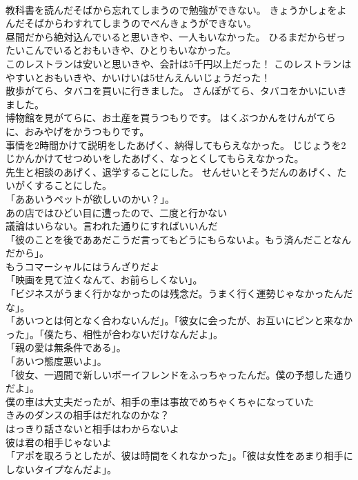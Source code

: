 \documentclass[8pt]{extreport}
\begin{document}
\begin{CJK}{UTF8}{min}
\\	教科書を読んだそばから忘れてしまうので勉強ができない。	きょうかしょをよんだそばからわすれてしまうのでべんきょうができない。 
\\	昼間だから絶対込んでいると思いきや、一人もいなかった。	ひるまだからぜったいこんでいるとおもいきや、ひとりもいなかった。 
\\	このレストランは安いと思いきや、会計は5千円以上だった！	このレストランはやすいとおもいきや、かいけいは5せんえんいじょうだった！ 
\\	散歩がてら、タバコを買いに行きました。	さんぽがてら、タバコをかいにいきました。 
\\	博物館を見がてらに、お土産を買うつもりです。	はくぶつかんをけんがてらに、おみやげをかうつもりです。 
\\	事情を2時間かけて説明をしたあげく、納得してもらえなかった。	じじょうを2じかんかけてせつめいをしたあげく、なっとくしてもらえなかった。 
\\	先生と相談のあげく、退学することにした。	せんせいとそうだんのあげく、たいがくすることにした。 
\\	「ああいうペットが欲しいのかい？」。	
\\	あの店ではひどい目に遭ったので、二度と行かない	
\\	議論はいらない。言われた通りにすればいいんだ	
\\	「彼のことを後でああだこうだ言ってもどうにもらないよ。もう済んだことなんだから」。	
\\	もうコマーシャルにはうんざりだよ	
\\	「映画を見て泣くなんて、お前らしくない」。	
\\	「ビジネスがうまく行かなかったのは残念だ。うまく行く運勢じゃなかったんだな」。	
\\	「あいつとは何となく合わないんだ」。「彼女に会ったが、お互いにピンと来なかった」。「僕たち、相性が合わないだけなんだよ」。	
\\	「親の愛は無条件である」。	
\\	「あいつ態度悪いよ」。	
\\	「彼女、一週間で新しいボーイフレンドをふっちゃったんだ。僕の予想した通りだよ」。	
\\	僕の車は大丈夫だったが、相手の車は事故でめちゃくちゃになっていた	
\\	きみのダンスの相手はだれなのかな？	
\\	はっきり話さないと相手はわからないよ	
\\	彼は君の相手じゃないよ	
\\	「アポを取ろうとしたが、彼は時間をくれなかった」。「彼は女性をあまり相手にしないタイプなんだよ」。	

\end{CJK}
\end{document}
